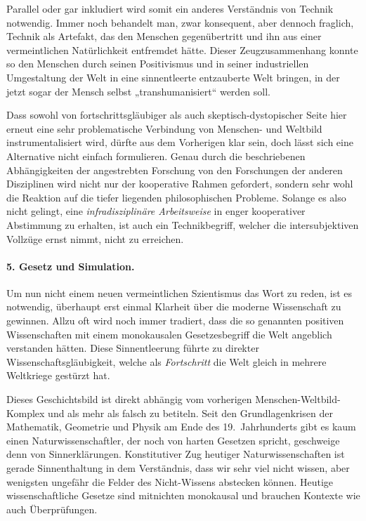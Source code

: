 \documentclass[a4paper,11pt]{article}
\begin{document}
Parallel oder gar inkludiert wird somit ein anderes Verständnis von Technik
notwendig. Immer noch behandelt man, zwar konsequent, aber dennoch fraglich,
Technik als Artefakt, das den Menschen gegenübertritt und ihn aus einer
vermeintlichen Natürlichkeit entfremdet hätte. Dieser Zeugzusammenhang konnte
so den Menschen durch seinen Positivismus und in seiner industriellen
Umgestaltung der Welt in eine sinnentleerte entzauberte Welt bringen, in der
jetzt sogar der Mensch selbst „transhumanisiert“ werden soll.

Dass sowohl von fortschrittsgläubiger als auch skeptisch-dystopischer Seite
hier erneut eine sehr problematische Verbindung von Menschen- und Weltbild
instrumentalisiert wird, dürfte aus dem Vorherigen klar sein, doch lässt sich
eine Alternative nicht einfach formulieren. Genau durch die beschriebenen
Abhängigkeiten der angestrebten Forschung von den Forschungen der anderen
Disziplinen wird nicht nur der kooperative Rahmen gefordert, sondern sehr wohl
die Reaktion auf die tiefer liegenden philosophischen Probleme. Solange es
also nicht gelingt, eine \emph{infradisziplinäre Arbeitsweise} in enger
kooperativer Abstimmung zu erhalten, ist auch ein Technikbegriff, welcher die
intersubjektiven Vollzüge ernst nimmt, nicht zu erreichen.

\paragraph{5. Gesetz und Simulation.}

Um nun nicht einem neuen vermeintlichen Szientismus das Wort zu reden, ist es
notwendig, überhaupt erst einmal Klarheit über die moderne Wissenschaft zu
gewinnen. Allzu oft wird noch immer tradiert, dass die so genannten positiven
Wissenschaften mit einem monokausalen Gesetzesbegriff die Welt angeblich
verstanden hätten.  Diese Sinnentleerung führte zu direkter
Wissenschaftsgläubigkeit, welche als \emph{Fortschritt} die Welt gleich in
mehrere Weltkriege gestürzt hat.

Dieses Geschichtsbild ist direkt abhängig vom vorherigen
Menschen-Weltbild-Komplex und als mehr als falsch zu betiteln.  Seit den
Grundlagenkrisen der Mathematik, Geometrie und Physik am Ende des
19.~Jahrhunderts gibt es kaum einen Naturwissenschaftler, der noch von harten
Gesetzen spricht, geschweige denn von Sinnerklärungen. Konstitutiver Zug
heutiger Naturwissenschaften ist gerade Sinnenthaltung in dem Verständnis,
dass wir sehr viel nicht wissen, aber wenigsten ungefähr die Felder des
Nicht-Wissens abstecken können. Heutige wissenschaftliche Gesetze sind
mitnichten monokausal und brauchen Kontexte wie auch Überprüfungen.
\end{document}
